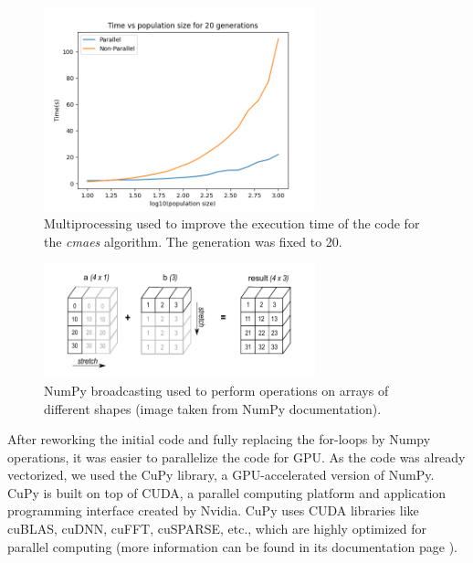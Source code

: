 \medskip

\begin{figure}[h]
    \centering
    \includegraphics[width=0.7\textwidth]{images/multiprocessing.png}
    \caption{Multiprocessing used to improve the execution time of the code for the \textit{cmaes} algorithm. The generation was fixed to 20.}
\end{figure}

\begin{figure}[h]
    \centering
    \includegraphics[width=0.7\textwidth]{images/broadcasting.png}
    \caption{NumPy broadcasting used to perform operations on arrays of different shapes (image taken from NumPy documentation).}
    \label{fig:broadcasting}
\end{figure}

\FloatBarrier

After reworking the initial code and fully replacing the for-loops by Numpy operations, it was easier to parallelize the code for GPU. As the code was already vectorized, we used the CuPy library, a GPU-accelerated 
version of NumPy. CuPy is built on top of CUDA, a parallel computing platform and application programming interface created by Nvidia. CuPy uses 
CUDA libraries like cuBLAS, cuDNN, cuFFT, cuSPARSE, etc., which are highly optimized for parallel computing (more information can be found in its 
documentation page \cite{cupy}).

